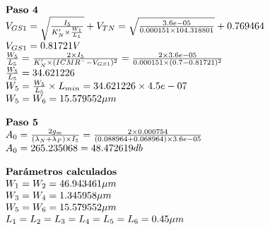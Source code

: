 \begin{equation*}
	\begin{array}{l l}
		\textbf{Paso 4} \\
		V_{GS1} = \sqrt{\frac{I_{5}}{K'_{N}\times\frac{W_{1}}{L_{1}}}}+V_{TN} = \sqrt{\frac{ 3.6e-05 }{ 0.000151 \times 104.318801 }}+ 0.769464  \\
		V_{GS1} =  0.81721  V \\
		\frac{W_{5}}{L_{5}} = \frac{2\times I_{5}}{K'_{N}\times (ICMR^{-}-V_{{GS1}})^{2}} = \frac{2\times 3.6e-05 }{ 0.000151 \times ( 0.7 - 0.81721 )^{2}} \\
		\frac{W_5}{L_5} =  34.621226  \\
		W_{5} = \frac{W_5}{L_5} \times L_{min} =  34.621226 \times 4.5e-07  \\
		W_{5} = W_{6} =  15.579552  \mu m \\
		\\
		\textbf{Paso 5} \\
		A_{0} = \frac{2g_{m}}{(\lambda_{N}+\lambda_{P})\times I_{5}} = \frac{2\times 0.000754 }{( 0.088964 + 0.068964 )\times 3.6e-05 } \\
		A_{0} =  265.235068  =  48.472619  db \\
		\\
		\textbf{Parámetros calculados} \\
		W_{1} = W_{2} =  46.943461  \mu m \\
		W_{3} = W_{4} =  1.345958  \mu m \\
		W_{5} = W_{6} =  15.579552  \mu m \\
		L_{1} = L_{2} = L_{3} = L_{4} = L_{5} = L_{6} = 0.45  \mu m \\
	\end{array}
\end{equation*}